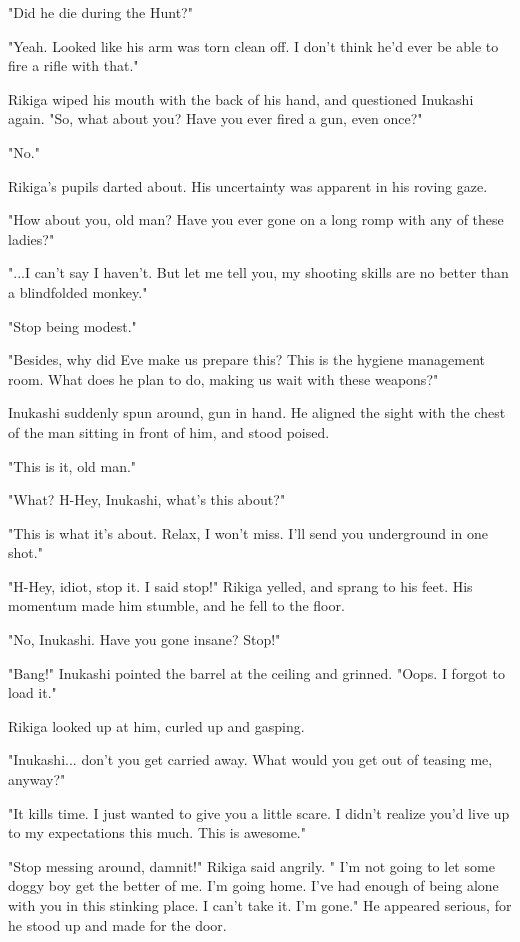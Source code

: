 "Did he die during the Hunt?"

"Yeah. Looked like his arm was torn clean off. I don't think he'd ever
be able to fire a rifle with that."

Rikiga wiped his mouth with the back of his hand, and questioned
Inukashi again. "So, what about you? Have you ever fired a gun, even
once?"

"No."

Rikiga's pupils darted about. His uncertainty was apparent in his roving
gaze.

"How about you, old man? Have you ever gone on a long romp with any of
these ladies?"

"...I can't say I haven't. But let me tell you, my shooting skills are
no better than a blindfolded monkey."

"Stop being modest."

"Besides, why did Eve make us prepare this? This is the hygiene
management room. What does he plan to do, making us wait with these
weapons?"

Inukashi suddenly spun around, gun in hand. He aligned the sight with
the chest of the man sitting in front of him, and stood poised.

"This is it, old man."

"What? H-Hey, Inukashi, what's this about?"

"This is what it's about. Relax, I won't miss. I'll send you underground
in one shot."

"H-Hey, idiot, stop it. I said stop!" Rikiga yelled, and sprang to his
feet. His momentum made him stumble, and he fell to the floor.

"No, Inukashi. Have you gone insane? Stop!"

"Bang!" Inukashi pointed the barrel at the ceiling and grinned. "Oops. I
forgot to load it."

Rikiga looked up at him, curled up and gasping.

"Inukashi... don't you get carried away. What would you get out of
teasing me, anyway?"

"It kills time. I just wanted to give you a little scare. I didn't
realize you'd live up to my expectations this much. This is awesome."

"Stop messing around, damnit!" Rikiga said angrily. " I'm not going to
let some doggy boy get the better of me. I'm going home. I've had enough
of being alone with you in this stinking place. I can't take it. I'm
gone." He appeared serious, for he stood up and made for the door.

